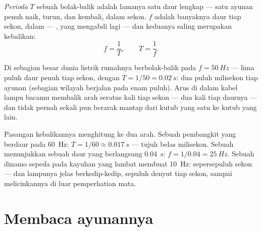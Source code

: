 \begin{definition}\label{def:g9:alternating-current:period}
\emph{Perioda} $T$ sebuah  bolak-balik adalah
lamanya satu daur lengkap --- satu ayunan penuh naik, turun, dan
kembali, dalam sekon. \emph{} $f$ adalah banyaknya daur
tiap sekon, dalam  ---  , yang mengabdi lagi --- dan
keduanya saling merupakan kebalikan:
\[
f = \frac{1}{T}, \qquad T = \frac{1}{f}.
\]
\end{definition}

\begin{proposition}\label{prop:g9:alternating-current:mains}
Di sebagian besar dunia listrik rumahnya berbolak-balik pada
$f = \qty{50}{Hz}$ --- lima puluh daur penuh tiap sekon, dengan
 $T = 1/50 = \qty{0.02}{s}$: dua puluh milisekon tiap ayunan
(sebagian wilayah berjalan pada enam puluh). Arus di dalam kabel lampu
bacamu membalik arah seratus kali tiap sekon --- dua kali tiap daurnya
--- dan tidak pernah sekali pun berarak mantap dari kutub yang satu ke
kutub yang lain.
\end{proposition}

\begin{example}\label{ex:g9:alternating-current:arithmetic}
Pasangan kebalikannya menghitung ke dua arah. Sebuah pembangkit yang
berdaur pada \qty{60}{Hz}: $T = 1/60 \approx \qty{0.017}{s}$ --- tujuh
belas milisekon. Sebuah  menunjukkan sebuah daur yang
berlangsung \qty{0.04}{s}: $f = 1/0.04 = \qty{25}{Hz}$. Sebuah dinamo
sepeda pada kayuhan yang lambat membuat \qty{10}{Hz}: 
sepersepuluh sekon --- dan lampunya jelas berkedip-kedip, sepuluh
denyut tiap sekon, sampai  melicinkannya di luar
pemperhatian mata.
\end{example}

\section{Membaca ayunannya}

